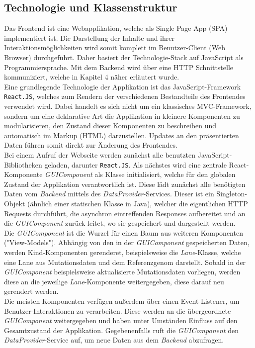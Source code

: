 \subsection{Technologie und Klassenstruktur}
Das Frontend ist eine Webapplikation, welche als Single Page App (SPA) implementiert ist. Die Darstellung der Inhalte und ihrer Interaktionsmöglichkeiten wird somit komplett im Benutzer-Client (Web Browser) durchgeführt. Daher basiert der Technologie-Stack auf JavaScript als Programmiersprache. Mit dem Backend wird über eine HTTP Schnittstelle kommuniziert, welche in Kapitel 4 näher erläutert wurde.\\
Eine grundlegende Technologie der Applikation ist das JavaScript-Framework \texttt{React.JS}, welches zum Rendern der verschiedenen Bestandteile des Frontendes verwendet wird. Dabei handelt es sich nicht um ein klassisches MVC-Framework, sondern um eine deklarative Art die Applikation in kleinere Komponenten zu modularisieren, den Zustand dieser Komponenten zu beschreiben und automatisch im Markup (HTML) darzustellen. Updates an den präsentierten Daten führen somit direkt zur Änderung des Frontendes.\\
Bei einem Aufruf der Webseite werden zunächst alle benutzten JavaScript-Bibliotheken geladen, darunter \texttt{React.JS}. Als nächstes wird eine zentrale React-Komponente \textit{GUIComponent} als Klasse initialisiert, welche für den globalen Zustand der Applikation verantwortlich ist. Diese lädt zunächst alle benötigten Daten vom \textit{Backend} mittels des \textit{DataProvider}-Services. Dieser ist ein Singleton-Objekt (ähnlich einer statischen Klasse in Java), welcher die eigentlichen HTTP Requests durchführt, die asynchron eintreffenden Responses aufbereitet und an die \textit{GUIComponent} zurück leitet, wo sie gespeichert und dargestellt werden.\\
Die \textit{GUIComponent} ist die Wurzel für einen Baum aus weiteren Komponenten ("View-Models"). Abhängig von den in der \textit{GUIComponent} gespeicherten Daten, werden Kind-Komponenten gerenderet, beispielsweise die \textit{Lane}-Klasse, welche eine Lane aus Mutationsdaten und dem Referenzgenom darstellt. Sobald in der \textit{GUIComponent} beispielsweise aktualisierte Mutationsdaten vorliegen, werden diese an die jeweilige \textit{Lane}-Komponente weitergegeben, diese darauf neu gerendert werden.\\
Die meisten Komponenten verfügen außerdem über einen Event-Listener, um Benutzer-Interaktionen zu verarbeiten. Diese werden an die übergeordnete \textit{GUIComponent} weitergegeben und haben unter Umständen Einfluss auf den Gesamtzustand der Applikation. Gegebenenfalls ruft die \textit{GUIComponent} den \textit{DataProvider}-Service auf, um neue Daten aus dem \textit{Backend} abzufragen.\\
\newpage
